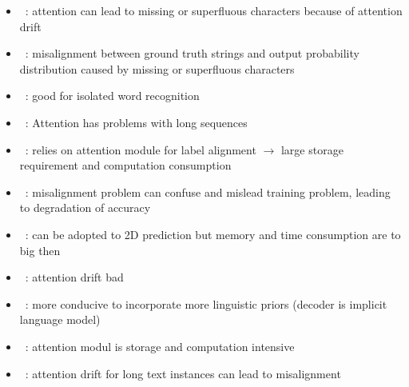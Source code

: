 \begin{itemize}
\begin{itemize}
\begin{itemize}
                    \item~\cite{bai_edit_2018}: attention can lead to missing or superfluous
                        characters because of attention drift
                    \item~\cite{liao_scene_2018}: misalignment between ground truth strings and
                        output probability distribution caused by missing or superfluous characters
                    \item~\cite{chen_text_2021}: good for isolated word recognition
                    \item~\cite{chen_text_2021}: Attention has problems with long sequences
                    \item~\cite{xie_aggregation_2019}: relies on attention module for label alignment
                        $\rightarrow$ large storage requirement and computation consumption
                    \item~\cite{xie_aggregation_2019}: misalignment problem can confuse and mislead
                        training problem, leading to degradation of accuracy
                    \item~\cite{xie_aggregation_2019}: can be adopted to 2D prediction but
                        memory and time consumption are to big then
                    \item~\cite{cheng_focusing_2017}: attention drift bad
                    \item~\cite{long_scene_2021}: more conducive to incorporate more linguistic
                        priors (decoder is implicit language model)
                    \item~\cite{chen_text_2021}: attention modul is storage and computation
                        intensive
                    \item~\cite{chen_text_2021}: attention drift for long text instances can lead
                        to misalignment
                \end{itemize}
        \end{itemize}
\end{itemize}

